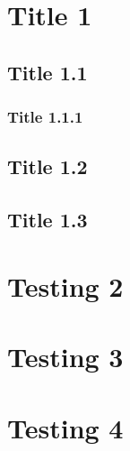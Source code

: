 \documentclass[12pt,a4paper]{article}
\begin{document}
\tableofcontents
\newpage
{}
\setcounter{page}{1}

\section{Title 1}

\subsection{Title 1.1}
\subsubsection{Title 1.1.1}
\lipsum[1-20]
\newpage
\subsection{Title 1.2}
\lipsum[1-20]
\newpage
\subsection{Title 1.3}
\begin{multicols}{2}
\lipsum[1-20]
\end{multicols}
\newpage
\section{Testing 2}
\lipsum[1-20]
\newpage
\section{Testing 3}
\lipsum[1-20]
\newpage
\section{Testing 4}
\lipsum[1-20]




\newpage
\begin{thebibliography}{7}

\end{thebibliography}
\end{document}
